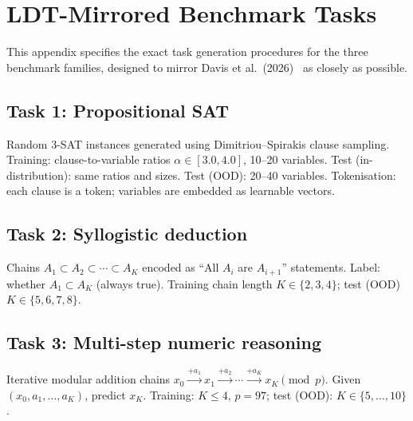 \documentclass[12pt,a4paper]{article}
\theoremstyle{plain}
\theoremstyle{definition}
\theoremstyle{remark}
\newcommand{\1}{\mathbf{1}}
\begin{document}
\section{LDT-Mirrored Benchmark Tasks}
\label{app:ldt_tasks}

This appendix specifies the exact task generation procedures for the
three benchmark families, designed to mirror Davis et
al.~(2026)~\cite{davis2026ldt} as closely as possible.

\subsection{Task 1: Propositional SAT}

Random 3-SAT instances generated using Dimitriou--Spirakis clause
sampling. Training: clause-to-variable ratios $\alpha \in [3.0, 4.0]$,
10--20 variables. Test (in-distribution): same ratios and sizes. Test
(OOD): 20--40 variables. Tokenisation: each clause is a token; variables
are embedded as learnable vectors.

\subsection{Task 2: Syllogistic deduction}

Chains $A_1 \subset A_2 \subset \cdots \subset A_K$ encoded as
``All $A_i$ are $A_{i+1}$'' statements. Label: whether
$A_1 \subset A_K$ (always true). Training chain length
$K \in \{2,3,4\}$; test (OOD) $K \in \{5,6,7,8\}$.

\subsection{Task 3: Multi-step numeric reasoning}

Iterative modular addition chains
$x_0 \xrightarrow{+a_1} x_1 \xrightarrow{+a_2} \cdots \xrightarrow{+a_K} x_K \pmod{p}$.
Given $(x_0, a_1, \dots, a_K)$, predict $x_K$. Training: $K \leq 4$,
$p = 97$; test (OOD): $K \in \{5,\dots,10\}$.
\end{document}
